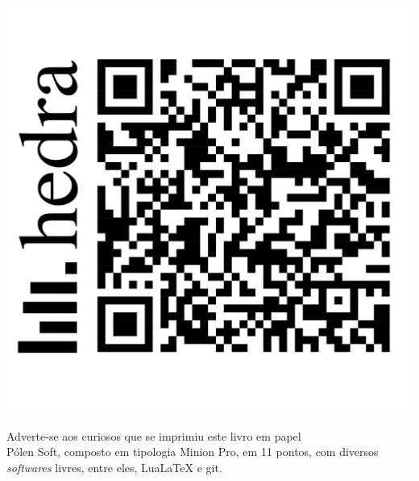 \pagebreak

\ifodd\thepage\blankpage\fi

\mbox{}\vfill

\begin{center}
	\includegraphics[width=.3\textwidth]{img/hedra-audio-qr.png}
\end{center}

\vfill

\begin{center}
		\begin{minipage}{.7\textwidth}\tiny\noindent{}
		\centering\tiny
		Adverte-se aos curiosos que se imprimiu este 
		livro
		em papel \\ Pólen Soft, composto em tipologia Minion Pro, em 11 pontos,
		com diversos \textit{softwares} livres, 
		entre eles, {Lua\LaTeX} e git.\\ 
		\medskip\\\
		\end{minipage}
\end{center}